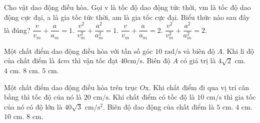 \begin{ex}
Cho vật dao động điều hòa. Gọi v là tốc độ dao động tức thời, vm là tốc độ dao động cực đại, a là gia tốc tức thời, am là gia tốc cực đại. Biểu thức nào sau đây là đúng?
\choice
{$\dfrac{{{v}^{{}}}}{v_{m}^{{}}}+\dfrac{{{a}^{{}}}}{a_{m}^{{}}}=1.$}
{\True $\dfrac{{{v}^{2}}}{v_{m}^{2}}+\dfrac{{{a}^{2}}}{a_{m}^{2}}=1.$}
{$\dfrac{{{v}^{{}}}}{v_{m}^{{}}}+\dfrac{{{a}^{{}}}}{a_{m}^{{}}}=2.$}
{$\dfrac{{{v}^{2}}}{v_{m}^{2}}+\dfrac{{{a}^{2}}}{a_{m}^{2}}=2.$}
\end{ex}

\begin{ex}Một chất điểm dao động điều hòa với tần số góc $\text{10 rad/s}$ và biên độ $A.$ Khi li độ của chất điểm là $4cm$ thì vận tốc đạt $\text{40}\text{cm/s}\text{.}$ Biên độ $A$ có giá trị là
\choice
{\True $4\sqrt{2}\text{ cm}.$}
{$4\text{ cm}.$}
{$8\text{ cm}.$}
{$5\text{ cm}.$}
\end{ex}

\begin{ex}
Một chất điểm dao động điều hòa trên trục $O\text{x}\text{.}$ Khi chất điểm đi qua vị trí cân bằng thì tốc độ của nó là $20\text{ cm/s}\text{.}$ Khi chất điểm có tốc độ là $10\text{ cm/s}$ thì gia tốc của nó có độ lớn là $40\sqrt{3}\text{ cm/}{{\text{s}}^{2}}.$ Biên độ dao động của chất điểm là
\choice
{\True $5\text{ cm}\text{.}$}
{$\text{4 cm}\text{.}$}
{$\text{10 cm}\text{.}$}
{$\text{8 cm}\text{.}$}
\end{ex}

